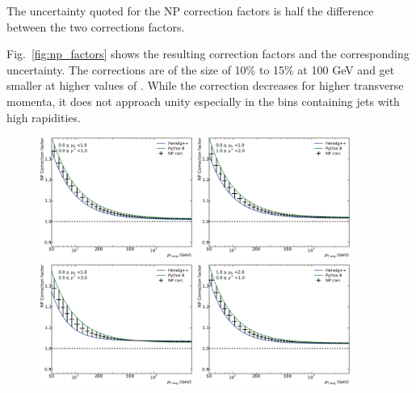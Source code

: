 The uncertainty quoted for the NP correction factors is half the difference
between the two corrections factors.

Fig.~\ref{fig:np_factors} shows the resulting correction factors and the
corresponding uncertainty.  The corrections are of the size of 10\% to 15\% at
100 \si{GeV} and get smaller at higher values of \ptavg. While the correction
decreases for higher transverse momenta, it does not approach unity especially
in the bins containing jets with high rapidities. 

\begin{figure}[htp]
    \centering
    \includegraphics[width=0.45\textwidth]{figures/theory/np_factors_calc_yb0ys0.pdf}\hfill
    \includegraphics[width=0.45\textwidth]{figures/theory/np_factors_calc_yb0ys1.pdf}
    \includegraphics[width=0.45\textwidth]{figures/theory/np_factors_calc_yb0ys2.pdf}\hfill
    \includegraphics[width=0.45\textwidth]{figures/theory/np_factors_calc_yb1ys0.pdf}

\end{figure}

